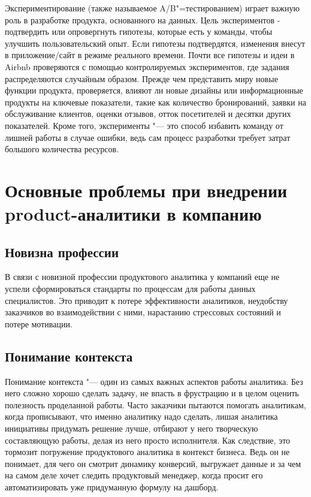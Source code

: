 \documentclass[referat, times]{SCWorks}
\begin{document}
Экспериментирование (также называемое A/B"=тестированием) играет важную роль в разработке продукта, основанного на данных. Цель экспериментов - подтвердить или опровергнуть гипотезы, которые есть у команды, чтобы улучшить пользовательский опыт. Если гипотезы подтвердятся, изменения внесут в приложение/сайт в режиме реального времени. Почти все гипотезы и идеи в Airbnb проверяются с помощью контролируемых экспериментов, где задания распределяются случайным образом. Прежде чем представить миру новые функции продукта,  проверяется, влияют ли новые дизайны или информационные продукты на ключевые показатели, такие как количество бронирований, заявки на обслуживание клиентов, оценки отзывов, отток посетителей и десятки других показателей. Кроме того, эксперименты "--- это способ избавить команду от лишней работы в случае ошибки, ведь сам процесс разработки требует затрат большого количества ресурсов\cite{airbnb}. 

\section{Основные проблемы при внедрении product-аналитики в компанию}
\subsection{Новизна профессии}
В связи с новизной профессии продуктового аналитика у компаний еще не успели сформироваться стандарты по процессам для работы данных специалистов. Это приводит к потере эффективности аналитиков, неудобству заказчиков во взаимодействии с ними, нарастанию стрессовых состояний и потере мотивации.

\subsection{Понимание контекста}
Понимание контекста "--- один из самых важных аспектов работы аналитика. Без него сложно хорошо сделать задачу, не впасть в фрустрацию и в целом оценить полезность проделанной работы. Часто заказчики пытаются помогать аналитикам, когда прописывают, что именно аналитику надо сделать, лишая аналитика инициативы придумать решение лучше, отбирают у него творческую составляющую работы, делая из него просто исполнителя. Как следствие, это тормозит погружение продуктового аналитика в контекст бизнеса. Ведь он не понимает, для чего он смотрит динамику конверсий, выгружает данные и за чем на самом деле хочет следить продуктовый менеджер, когда просит его автоматизировать уже придуманную формулу на дашборд.
\end{document}

